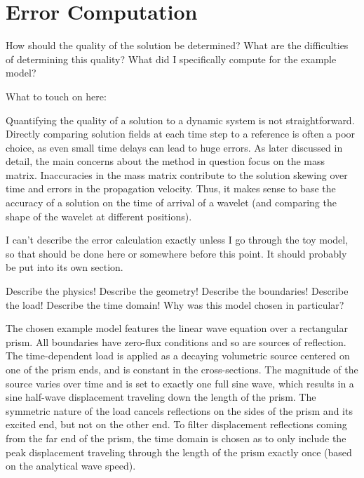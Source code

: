 %
\section{Error Computation}
\label{section:errorcomputation}
%

How should the quality of the solution be determined?
What are the difficulties of determining this quality?
What did I specifically compute for the example model?

What to touch on here:

Quantifying the quality of a solution to a dynamic system is not straightforward.
Directly comparing solution fields at each time step to a reference is often a
poor choice, as even small time delays can lead to huge errors.
As later discussed in detail, the main concerns about the method in question
focus on the mass matrix. Inaccuracies in the mass matrix contribute to
the solution skewing over time and errors in the propagation velocity. Thus, it
makes sense to base the accuracy of a solution on the time of arrival of a wavelet
(and comparing the shape of the wavelet at different positions).

I can't describe the error calculation exactly unless I go through the toy model,
so that should be done here or somewhere before this point. It should probably be
put into its own section.

Describe the physics!
Describe the geometry!
Describe the boundaries!
Describe the load!
Describe the time domain!
Why was this model chosen in particular?

The chosen example model features the linear wave equation over a rectangular prism.
All boundaries have zero-flux conditions and so are sources of reflection. The
time-dependent load is applied as a decaying volumetric source centered on one
of the prism ends, and is constant in the cross-sections.
The magnitude of the source varies over time and is set to exactly one full sine wave,
which results in a sine half-wave displacement traveling down the length of the prism.
The symmetric nature of the load cancels reflections on the sides of the prism and
its excited end, but not on the other end. To filter displacement reflections coming
from the far end of the prism, the time domain is chosen as to only include the peak
displacement traveling through the length of the prism exactly once (based on the
analytical wave speed).

